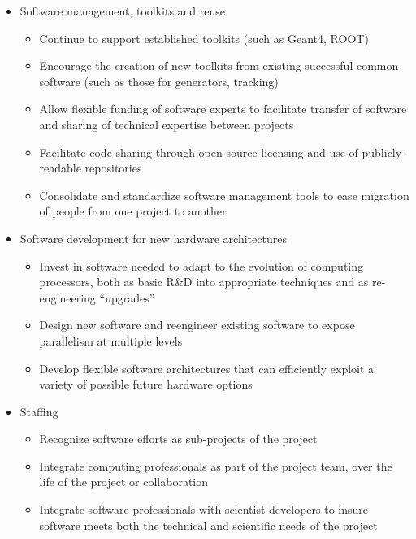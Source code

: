 \begin{itemize}
    \item Software management, toolkits and reuse
    \begin{itemize}
        \item Continue to support established toolkits (such as Geant4, ROOT)
        \item Encourage the creation of new toolkits from existing successful common software (such as those for generators, tracking) 
        \item  Allow flexible funding of software experts to facilitate transfer of software and sharing of technical expertise between projects
        \item Facilitate code sharing through open-source licensing and use of publicly-readable repositories
        \item Consolidate and standardize software management tools to ease
migration of people from one project to another
    \end{itemize}

    \item Software development for new hardware architectures
    \begin{itemize}
        \item Invest in software needed to adapt to the evolution of computing processors, both as basic R\&D into appropriate
techniques and as re-engineering ``upgrades''
        \item Design new software and reengineer existing software to expose parallelism at multiple levels
        \item Develop flexible software architectures that can efficiently exploit a variety of possible future hardware options
    \end{itemize}    

    \item Staffing
      \begin{itemize}
          \item Recognize software efforts as sub-projects of the project
          \item Integrate computing professionals as part of the project team, over the life of the project or collaboration
          \item Integrate software professionals with scientist developers to insure software meets both the technical and scientific needs of the project
      \end{itemize}


\end{itemize}
